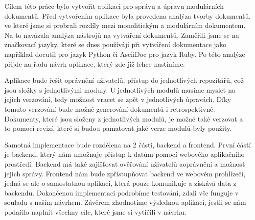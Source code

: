 Cílem této práce bylo vytvořit aplikaci pro správu a úpravu modulárních dokumentů. Před vytvořením aplikace byla provedena
analýza tvorby dokumentů, ve které jsme si probrali
rozdíly mezi monolitickým a modulárním dokumentem. Na to navázala analýza nástrojů na vytváření dokumentů. Zaměřili jsme se na značkovací jazyky,
které se dnes používájí při vytváření dokumentace
jako například docutil pro jazyk Python či AsciiDoc pro jazyk Ruby.
Po této analýze přijde na řadu návrh aplikace, který zde již lehce nastíníme.

Aplikace bude řešit oprávnění uživatelů, přístup do
jednotlivých repozitářů, což jsou složky s jednotlivými moduly. U jednotlivých modulů musíme myslet na jejich verzování, tedy možnost
vracet se zpět v jednotlivých úpravách. Díky tomuto verzování bude možné generování dokumentů i retrospektivně. Dokumenty, které jsou
složeny z jednotlivých modulů, je možné také verzovat a to pomocí revizí, které si budou pamatovat jaké verze modulů byly použity.

Samotná implementace bude rozdělena na 2 části, backend a frontend. První částí je backend, který nám umožnuje přístup k datům pomocí webového aplikačního
prostředí. Backend má také zajišťovat ověřování uživatelů a\linebreak oprávnění a možnost jejich správy. Frontend nám bude zpřístupňovat \mbox{backend}
ve webovém prohlízeči, jedná se ale o samostatnou aplikaci, která pouze komunikuje a získává data z backendu. Dokončenou implementaci podrobíme
testování, zdali vše funguje v souladu s naším návrhem. Závěrem zhodnotíme výslednou aplikaci, jestli se nám podařilo naplnit všechny cíle, které jsme
si vytičili v návrhu.